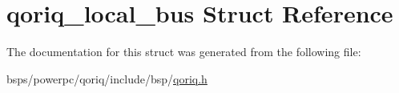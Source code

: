 \hypertarget{structqoriq__local__bus}{}\section{qoriq\+\_\+local\+\_\+bus Struct Reference}
\label{structqoriq__local__bus}


The documentation for this struct was generated from the following file\+:\begin{DoxyCompactItemize}
\item 
bsps/powerpc/qoriq/include/bsp/\mbox{\hyperlink{qoriq_8h}{qoriq.\+h}}\end{DoxyCompactItemize}
